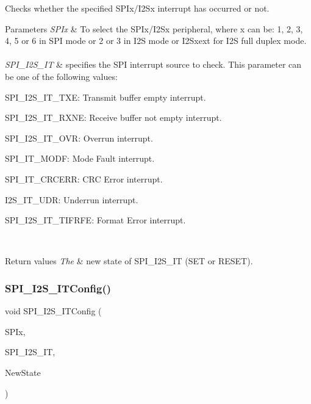 Checks whether the specified S\+P\+Ix/\+I2\+Sx interrupt has occurred or not. 


\begin{DoxyParams}{Parameters}
{\em S\+P\+Ix} & To select the S\+P\+Ix/\+I2\+Sx peripheral, where x can be\+: 1, 2, 3, 4, 5 or 6 in S\+PI mode or 2 or 3 in I2S mode or I2\+Sxext for I2S full duplex mode. ~\newline
\\
\hline
{\em S\+P\+I\+\_\+\+I2\+S\+\_\+\+IT} & specifies the S\+PI interrupt source to check. This parameter can be one of the following values\+: \begin{DoxyItemize}
\item S\+P\+I\+\_\+\+I2\+S\+\_\+\+I\+T\+\_\+\+T\+XE\+: Transmit buffer empty interrupt. \item S\+P\+I\+\_\+\+I2\+S\+\_\+\+I\+T\+\_\+\+R\+X\+NE\+: Receive buffer not empty interrupt. \item S\+P\+I\+\_\+\+I2\+S\+\_\+\+I\+T\+\_\+\+O\+VR\+: Overrun interrupt. \item S\+P\+I\+\_\+\+I\+T\+\_\+\+M\+O\+DF\+: Mode Fault interrupt. \item S\+P\+I\+\_\+\+I\+T\+\_\+\+C\+R\+C\+E\+RR\+: C\+RC Error interrupt. \item I2\+S\+\_\+\+I\+T\+\_\+\+U\+DR\+: Underrun interrupt. ~\newline
 \item S\+P\+I\+\_\+\+I2\+S\+\_\+\+I\+T\+\_\+\+T\+I\+F\+R\+FE\+: Format Error interrupt. ~\newline
\end{DoxyItemize}
\\
\hline
\end{DoxyParams}

\begin{DoxyRetVals}{Return values}
{\em The} & new state of S\+P\+I\+\_\+\+I2\+S\+\_\+\+IT (S\+ET or R\+E\+S\+ET). \\
\hline
\end{DoxyRetVals}
\mbox{\label{group___s_p_i_ga17f4ef132e8ddbf94cb6b1688d181e41}} 
\subsubsection{\texorpdfstring{S\+P\+I\+\_\+\+I2\+S\+\_\+\+I\+T\+Config()}{SPI\_I2S\_ITConfig()}}
{\footnotesize\ttfamily void S\+P\+I\+\_\+\+I2\+S\+\_\+\+I\+T\+Config (\begin{DoxyParamCaption}\item[{S\+P\+I\+\_\+\+Type\+Def $\ast$}]{S\+P\+Ix,  }\item[{uint8\+\_\+t}]{S\+P\+I\+\_\+\+I2\+S\+\_\+\+IT,  }\item[{Functional\+State}]{New\+State }\end{DoxyParamCaption})}



